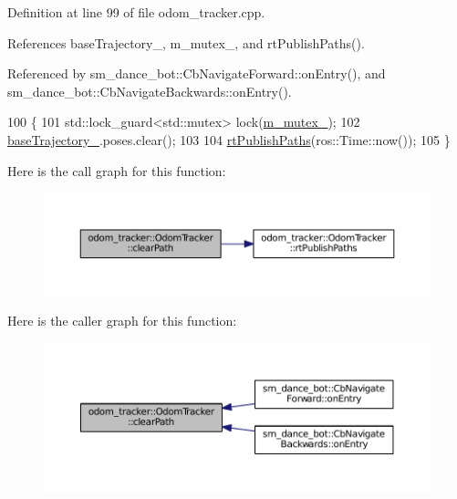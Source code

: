 Definition at line 99 of file odom\+\_\+tracker.\+cpp.



References base\+Trajectory\+\_\+, m\+\_\+mutex\+\_\+, and rt\+Publish\+Paths().



Referenced by sm\+\_\+dance\+\_\+bot\+::\+Cb\+Navigate\+Forward\+::on\+Entry(), and sm\+\_\+dance\+\_\+bot\+::\+Cb\+Navigate\+Backwards\+::on\+Entry().


\begin{DoxyCode}
100 \{
101     std::lock\_guard<std::mutex> lock(\hyperlink{classodom__tracker_1_1OdomTracker_a17f1d82ae3d6441a4387af8fb83a3e20}{m\_mutex\_});
102     \hyperlink{classodom__tracker_1_1OdomTracker_a889adca220c33056d9a582eceda64adc}{baseTrajectory\_}.poses.clear();
103 
104     \hyperlink{classodom__tracker_1_1OdomTracker_ade06ab05e1853fbccd3702f88f0a42e5}{rtPublishPaths}(ros::Time::now());
105 \}
\end{DoxyCode}


Here is the call graph for this function\+:
\nopagebreak
\begin{figure}[H]
\begin{center}
\leavevmode
\includegraphics[width=350pt]{classodom__tracker_1_1OdomTracker_a03c47908606d48e20b3b7e7b583b341d_cgraph}
\end{center}
\end{figure}




Here is the caller graph for this function\+:
\nopagebreak
\begin{figure}[H]
\begin{center}
\leavevmode
\includegraphics[width=350pt]{classodom__tracker_1_1OdomTracker_a03c47908606d48e20b3b7e7b583b341d_icgraph}
\end{center}
\end{figure}


